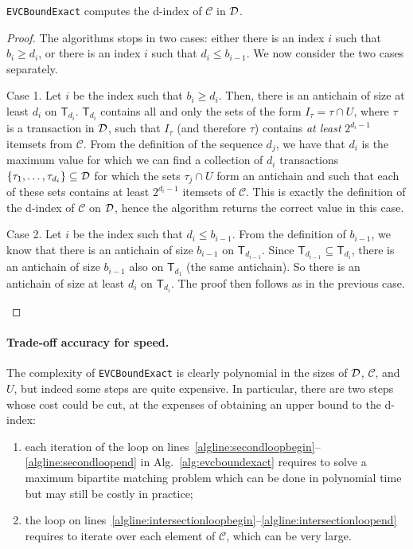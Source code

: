 \begin{lemma}\label{lem:evcboundexactcorrect}
	\texttt{EVCBoundExact} computes the d-index of $\mathcal{C}$ in ${\cal D}$.
\end{lemma}
\begin{proof}
	The algorithms stops in two cases: either there is an index $i$ such that
	$b_i\ge d_i$, or there is an index $i$ such that $d_i\le b_{i-1}$. We now
	consider the two cases separately.

	\begin{description}
		\item{Case 1.} Let $i$ be the index such that $b_i\ge d_i$. Then, there
			is an antichain of size at least $d_i$ on $\mathsf{T}_{d_i}$.
			$\mathsf{T}_{d_i}$ contains all and only the sets of the form
			$I_\tau=\tau\cap U$, where $\tau$ is a transaction in ${\cal D}$, such
			that $I_\tau$ (and therefore $\tau$) contains \emph{at least}
			$2^{d_i-1}$ itemsets from $\mathcal{C}$. From the definition of the
			sequence $d_j$, we have that $d_i$ is the maximum value for which we
			can find a collection of $d_i$ transactions
			$\{\tau_1,\dotsc,\tau_{d_i}\}\subseteq{\cal D}$ for which the sets
			$\tau_j\cap U$ form an antichain and such that each of these sets
			contains at least $2^{d_i-1}$ itemsets of $\mathcal{C}$. This is
			exactly the definition of the d-index of $\mathcal{C}$ on ${\cal D}$,
			hence the algorithm returns the correct value in this case.
		\item{Case 2.} Let $i$ be the index such that $d_i\le b_{i-1}$. From the
			definition of $b_{i-1}$, we know that there is an antichain of size
			$b_{i-1}$ on $\mathsf{T}_{d_{i-1}}$. Since
			$\mathsf{T}_{d_{i-1}}\subseteq \mathsf{T}_{d_i}$, there is an
			antichain of size $b_{i-1}$ also on $\mathsf{T}_{d_1}$ (the same
			antichain). So there is an antichain of size at least $d_i$ on
			$\mathsf{T}_{d_i}$. The proof then follows as in the previous case.
	\end{description}
\end{proof}

\paragraph{Trade-off accuracy for speed.} The complexity of
\texttt{EVCBoundExact} is clearly polynomial in the sizes of ${\cal D}$,
$\mathcal{C}$, and $U$, but indeed some steps are quite expensive. In
particular, there are two steps whose cost could be cut, at the expenses of
obtaining an upper bound to the d-index:
\begin{enumerate}
	\item each iteration of the loop on
		lines~\ref{algline:secondloopbegin}--\ref{algline:secondloopend} in
		Alg.~\ref{alg:evcboundexact} requires to solve a maximum bipartite
		matching problem which can be done in polynomial time but may still be
		costly in practice;
	\item the loop on
		lines~\ref{algline:intersectionloopbegin}--\ref{algline:intersectionloopend}
		requires to iterate over each element of $\mathcal{C}$, which can be
		very large.
\end{enumerate}


